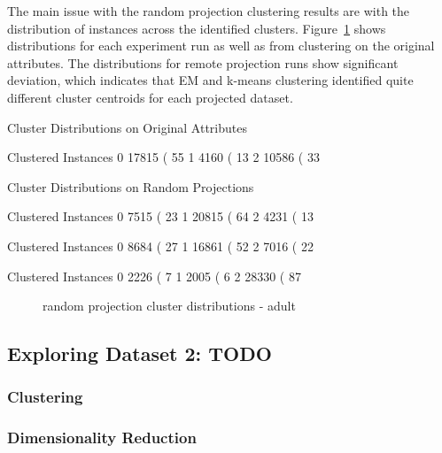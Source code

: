 \documentclass{sig-alternate}
\begin{document}
The main issue with the random projection clustering results are with the distribution of instances across the identified clusters. Figure~\ref{rp-custer-dist-adult} shows distributions for each experiment run as well as from clustering on the original attributes. The distributions for remote projection runs show significant deviation, which indicates that EM and k-means clustering identified quite different cluster centroids for each projected dataset.

\begin{verbbox}
Cluster Distributions on Original Attributes

Clustered Instances
0      17815 ( 55%
1       4160 ( 13%
2      10586 ( 33%


Cluster Distributions on Random Projections

Clustered Instances
0       7515 ( 23%
1      20815 ( 64%
2       4231 ( 13%

Clustered Instances
0       8684 ( 27%
1      16861 ( 52%
2       7016 ( 22%

Clustered Instances
0       2226 (  7%
1       2005 (  6%
2      28330 ( 87%
\end{verbbox}

\begin{figure}[!htbp]
    \centering
    \theverbbox
    \caption{random projection cluster distributions - adult\label{rp-custer-dist-adult}}
\end{figure}





\subsection{Exploring Dataset 2: TODO}

\subsubsection{Clustering}


\subsubsection{Dimensionality Reduction}

\end{document}
